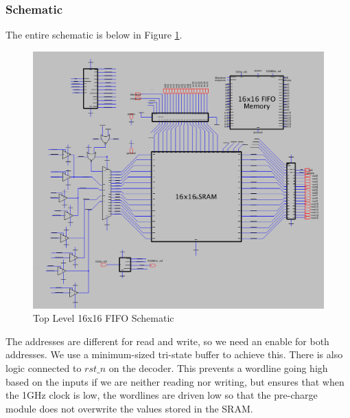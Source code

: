 \documentclass[a4paper]{article}
\begin{document}
\subsubsection{Schematic}
The entire schematic is below in Figure \ref{fig:topLevelSchematic}.

\begin{figure}[H]
	\centering
	\includegraphics[scale=0.3]{topLevelSchematic}
	\caption{Top Level 16x16 FIFO Schematic}
	\label{fig:topLevelSchematic}
\end{figure}

The addresses are different for read and write, so we need an enable for both addresses. We use a minimum-sized tri-state buffer to achieve this. There is also logic connected to $rst\_n$ on the decoder. This prevents a wordline going high based on the inputs if we are neither reading nor writing, but ensures that when the 1GHz clock is low, the wordlines are driven low so that the pre-charge module does not overwrite the values stored in the SRAM.
\end{document}
